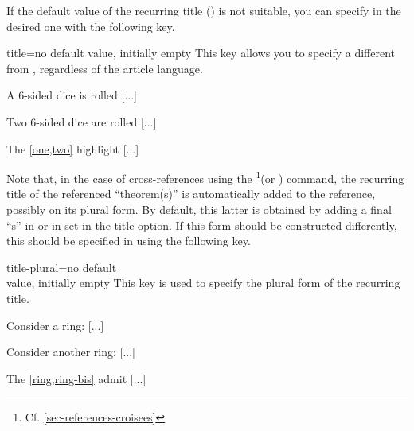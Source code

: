 \documentclass[english,nolocaltoc]{nwejmart}
\newtheorem[style=definition]{fact}
\newtheorem[title=experience]{experience}
\newtheorem[title-plural=rings]{ring}
\newtheorem[title=ideal,title-plural=ideals]{ideal}
\begin{document}
 If the  default value of the recurring title  () is not
 suitable, you can specify in  the desired one with
 the following   key.
  \begin{docKey}{title}{={}}{no  default value,
      initially empty}
    This key allows you to specify a  different from
    , regardless of the article language.
  \end{docKey}
\begin{bodycode}[listing and text,listing options={deletekeywords={[2]label}}]
\begin{experience}\label{one}
A 6-sided dice is rolled [...]
\end{experience}
\begin{experience}\label{two}
Two 6-sided dice are rolled [...]
\end{experience}
The \vref{one,two} highlight [...]
\end{bodycode}

  Note that, in the case of cross-references using the \footnote{Cf. \vref{sec-references-croisees}}(or
  )  command, the recurring title of the referenced
  \enquote{theorem(s)}  is automatically added to the reference,
  possibly on its plural form. By default, this latter is obtained by
  adding a final  \enquote{s} in  or in  set in the title option. If this form should be constructed
  differently, this should be specified in  using the
  following  key.
  
  \begin{docKey}{title-plural}{={}}{no default \\value, initially empty}
    This key is used to specify the plural form of the recurring title.
  \end{docKey}
\begin{bodycode}[listing and text,listing options={deletekeywords={[2]label}}]
\begin{ring}\label{ring}
Consider a ring: [...]
\end{ring}
\begin{ring}\label{ring-bis}
Consider another ring: [...]
\end{ring}
The \vref{ring,ring-bis} admit [...]
\end{bodycode}
\end{document}
